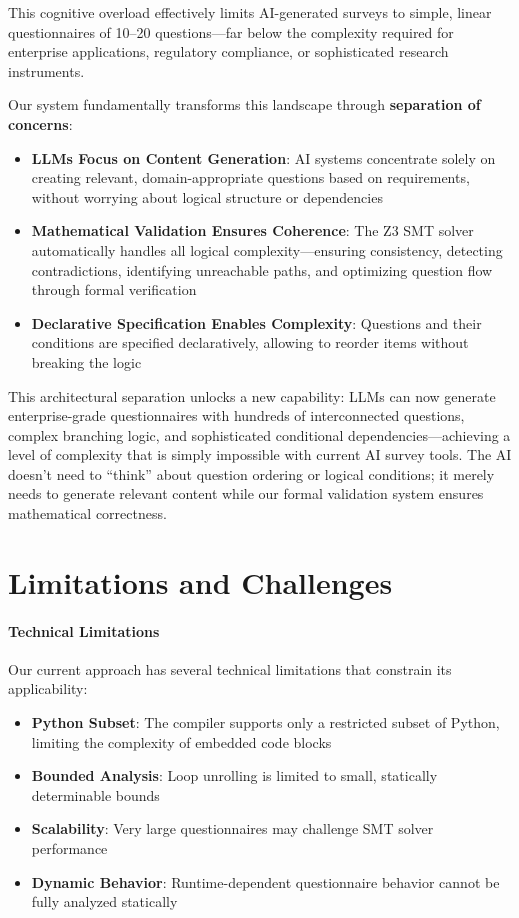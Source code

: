 This cognitive overload effectively limits AI-generated surveys to simple, linear questionnaires of 10–20 questions—far below the complexity required for enterprise applications, regulatory compliance, or sophisticated research instruments.

Our system fundamentally transforms this landscape through \textbf{separation of concerns}:

\begin{itemize}
    \item \textbf{LLMs Focus on Content Generation}: AI systems concentrate solely on creating relevant, domain-appropriate questions based on requirements, without worrying about logical structure or dependencies
    \item \textbf{Mathematical Validation Ensures Coherence}: The Z3 SMT solver automatically handles all logical complexity—ensuring consistency, detecting contradictions, identifying unreachable paths, and optimizing question flow through formal verification
    \item \textbf{Declarative Specification Enables Complexity}: Questions and their conditions are specified declaratively, allowing to reorder items without breaking the logic
\end{itemize}

This architectural separation unlocks a new capability: LLMs can now generate enterprise-grade questionnaires with hundreds of interconnected questions, complex branching logic, and sophisticated conditional dependencies—achieving a level of complexity that is simply impossible with current AI survey tools. The AI doesn't need to ``think'' about question ordering or logical conditions; it merely needs to generate relevant content while our formal validation system ensures mathematical correctness.

\section{Limitations and Challenges}

\paragraph{Technical Limitations}

Our current approach has several technical limitations that constrain its applicability:

\begin{itemize}
    \item \textbf{Python Subset}: The compiler supports only a restricted subset of Python, limiting the complexity of embedded code blocks
    \item \textbf{Bounded Analysis}: Loop unrolling is limited to small, statically determinable bounds
    \item \textbf{Scalability}: Very large questionnaires may challenge SMT solver performance
    \item \textbf{Dynamic Behavior}: Runtime-dependent questionnaire behavior cannot be fully analyzed statically
\end{itemize}

